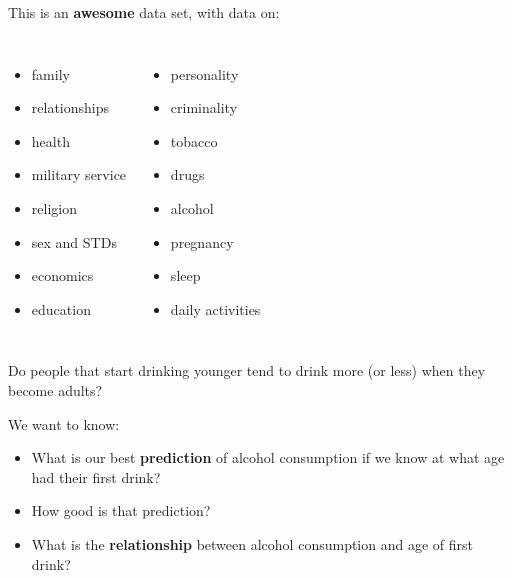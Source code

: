 \documentclass{beamer}
\begin{document}
\begin{darkframes}
    \begin{frame}
      This is an \textbf{awesome} data set, with data on:
      \begin{columns}[onlytextwidth]
          \begin{itemize}
            \item family
            \item relationships
            \item health
            \item military service
            \item religion
            \item sex and STDs
            \item economics
            \item education
          \end{itemize}
          \begin{itemize}
            \item personality
            \item criminality
            \item tobacco
            \item drugs
            \item alcohol
            \item pregnancy
            \item sleep
            \item daily activities
          \end{itemize}
      \end{columns}
    \end{frame}

    \begin{frame}
      \begin{center}
        Do people that start drinking younger tend to drink more (or less) when they become adults?
      \end{center}
      \bigskip\pause
      We want to know:
      \begin{itemize}[<+->]
        \item What is our best \textbf{prediction} of alcohol consumption if we know at what age had their first drink?
        \item How good is that prediction?
        \item What is the \textbf{relationship} between alcohol consumption and age of first drink?
      \end{itemize}
    \end{frame}


\end{darkframes}
\end{document}
